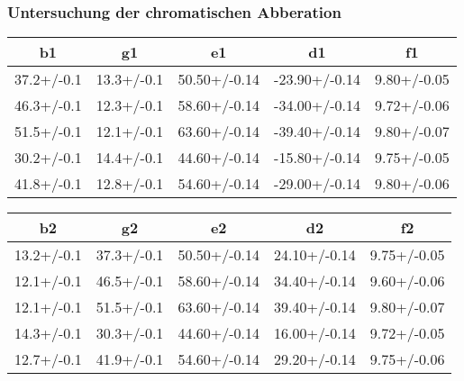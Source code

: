 \subsubsection{Untersuchung der chromatischen Abberation}
\begin{table}
  \centering
\begin{tabular}{ccccc}
  \toprule
b1 & g1 & e1 & d1 & f1 \\
\midrule
37.2+/-0.1 & 13.3+/-0.1 & 50.50+/-0.14 & -23.90+/-0.14 & 9.80+/-0.05 \\
46.3+/-0.1 & 12.3+/-0.1 & 58.60+/-0.14 & -34.00+/-0.14 & 9.72+/-0.06 \\
51.5+/-0.1 & 12.1+/-0.1 & 63.60+/-0.14 & -39.40+/-0.14 & 9.80+/-0.07 \\
30.2+/-0.1 & 14.4+/-0.1 & 44.60+/-0.14 & -15.80+/-0.14 & 9.75+/-0.05 \\
41.8+/-0.1 & 12.8+/-0.1 & 54.60+/-0.14 & -29.00+/-0.14 & 9.80+/-0.06 \\
\bottomrule
\end{tabular}
\end{table}
\begin{table}
  \centering
\begin{tabular}{ccccc}
  \toprule
b2 & g2 & e2 & d2 & f2 \\
\midrule
13.2+/-0.1 & 37.3+/-0.1 & 50.50+/-0.14 & 24.10+/-0.14 & 9.75+/-0.05 \\
12.1+/-0.1 & 46.5+/-0.1 & 58.60+/-0.14 & 34.40+/-0.14 & 9.60+/-0.06 \\
12.1+/-0.1 & 51.5+/-0.1 & 63.60+/-0.14 & 39.40+/-0.14 & 9.80+/-0.07 \\
14.3+/-0.1 & 30.3+/-0.1 & 44.60+/-0.14 & 16.00+/-0.14 & 9.72+/-0.05 \\
12.7+/-0.1 & 41.9+/-0.1 & 54.60+/-0.14 & 29.20+/-0.14 & 9.75+/-0.06 \\
\bottomrule
\end{tabular}
\end{table}

